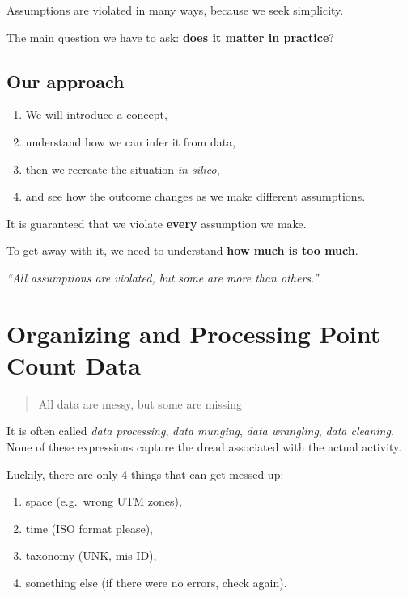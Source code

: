 \documentclass[12pt,]{book}
\providecommand{\tightlist}{%
  \setlength{\itemsep}{0pt}\setlength{\parskip}{0pt}}
\begin{document}
Assumptions are violated in many ways, because we seek simplicity.

The main question we have to ask: \textbf{does it matter in practice}?

\hypertarget{our-approach}{%
\section{Our approach}\label{our-approach}}

\begin{enumerate}
\def\labelenumi{\arabic{enumi}.}
\tightlist
\item
  We will introduce a concept,
\item
  understand how we can infer it from data,
\item
  then we recreate the situation \emph{in silico},
\item
  and see how the outcome changes as we make different assumptions.
\end{enumerate}

It is guaranteed that we violate \textbf{every} assumption we make.

To get away with it, we need to understand \textbf{how much is too much}.

\emph{``All assumptions are violated, but some are more than others.''}

\hypertarget{pcdata}{%
\chapter{Organizing and Processing Point Count Data}\label{pcdata}}

\begin{quote}
All data are messy, but some are missing
\end{quote}

It is often called \emph{data processing}, \emph{data munging},
\emph{data wrangling}, \emph{data cleaning}.
None of these expressions capture the dread associated with the actual activity.

Luckily, there are only 4 things that can get messed up:

\begin{enumerate}
\def\labelenumi{\arabic{enumi}.}
\tightlist
\item
  space (e.g.~wrong UTM zones),
\item
  time (ISO format please),
\item
  taxonomy (UNK, mis-ID),
\item
  something else (if there were no errors, check again).
\end{enumerate}
\end{document}
